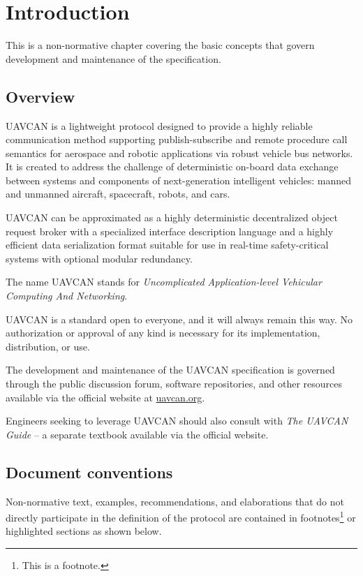 \chapter{Introduction}\label{sec:introduction}

This is a non-normative chapter covering the basic concepts that govern development and maintenance of
the specification.

\section{Overview}

UAVCAN is a lightweight protocol designed to provide a highly reliable communication method
supporting publish-subscribe and remote procedure call semantics
for aerospace and robotic applications via robust vehicle bus networks.
It is created to address the challenge of deterministic on-board data exchange between systems and components
of next-generation intelligent vehicles: manned and unmanned aircraft, spacecraft, robots, and cars.

UAVCAN can be approximated as a highly deterministic decentralized object request broker
with a specialized interface description language and a highly efficient data serialization format
suitable for use in real-time safety-critical systems with optional modular redundancy.

The name UAVCAN stands for \emph{Uncomplicated Application-level Vehicular Computing And Networking}.

UAVCAN is a standard open to everyone, and it will always remain this way.
No authorization or approval of any kind is necessary for its implementation, distribution, or use.

The development and maintenance of the UAVCAN specification is governed through the public discussion forum,
software repositories, and other resources available via the official website at \href{http://uavcan.org}{uavcan.org}.

Engineers seeking to leverage UAVCAN should also consult with \emph{The UAVCAN Guide} --
a separate textbook available via the official website.

\section{Document conventions}

Non-normative text, examples, recommendations, and elaborations that do not directly participate
in the definition of the protocol are contained in footnotes\footnote{This is a footnote.}
or highlighted sections as shown below.

